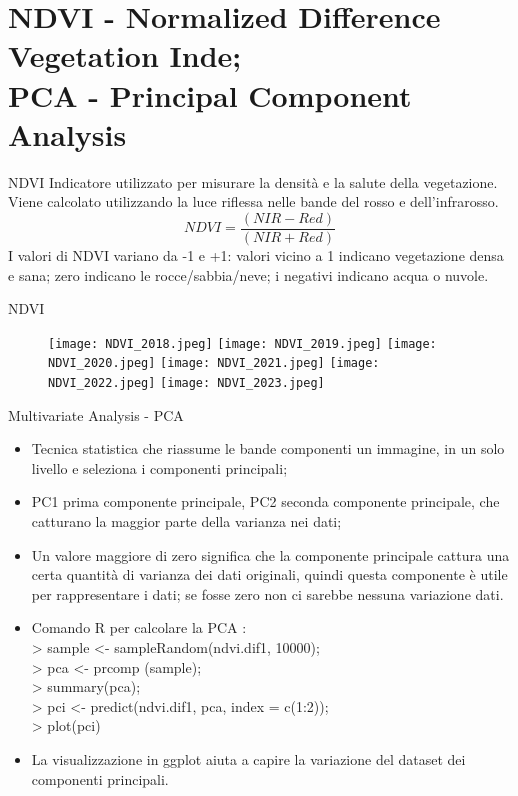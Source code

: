 \documentclass[10pt]{beamer}
\begin{document}
\section{NDVI - Normalized Difference Vegetation Inde; \\
PCA - Principal Component Analysis}
\begin{frame}{NDVI}
Indicatore utilizzato per misurare la densità e la salute della vegetazione. Viene calcolato utilizzando la luce riflessa nelle bande del rosso e dell'infrarosso.
\begin{equation}
NDVI = \frac{(NIR-Red)}{(NIR+Red)} 
\end{equation}
\label{NDVI}
I valori di NDVI variano da -1 e +1: valori vicino a 1 indicano vegetazione densa e sana; zero indicano le rocce/sabbia/neve; i negativi indicano acqua o nuvole. 
\end{frame}

\begin{frame}{NDVI}
\begin{figure}
        \centering
        \texttt{[image: NDVI\_2018.jpeg]}
        \texttt{[image: NDVI\_2019.jpeg]} 
        \texttt{[image: NDVI\_2020.jpeg]}
        \texttt{[image: NDVI\_2021.jpeg]}
        \texttt{[image: NDVI\_2022.jpeg]} 
        \texttt{[image: NDVI\_2023.jpeg]}
    \end{figure}
\end{frame}

\begin{frame}{Multivariate Analysis - PCA}
\begin{itemize}
    \item Tecnica statistica che riassume le bande componenti un immagine, in un solo livello e seleziona i componenti principali;
    \item PC1 prima componente principale, PC2 seconda componente principale, che catturano la maggior parte della varianza nei dati; 
    \item Un valore maggiore di zero significa che la componente principale cattura una certa quantità di varianza dei dati originali, quindi questa componente è utile per rappresentare i dati; se fosse zero non ci sarebbe nessuna variazione dati.
    \item Comando R per calcolare la PCA : \\
            > sample <- sampleRandom(ndvi.dif1, 10000); \\
            > pca <- prcomp (sample);\\
            > summary(pca);\\
            > pci <- predict(ndvi.dif1, pca, index = c(1:2));\\
            > plot(pci)
    \item La visualizzazione in ggplot aiuta a capire la variazione del dataset dei componenti principali.
\end{itemize}
\end{frame}
\end{document}
